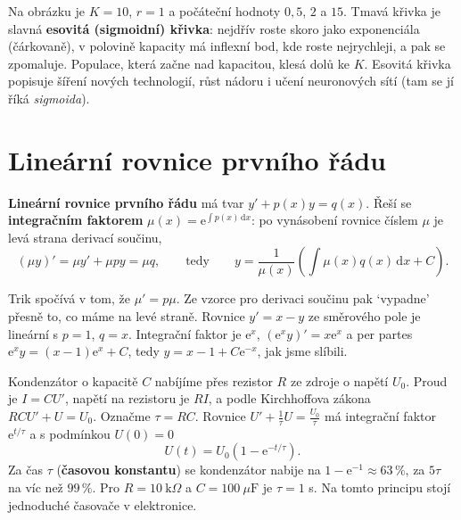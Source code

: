 Na obrázku je $K = 10$, $r = 1$ a počáteční hodnoty $0{,}5$, $2$ a $15$. Tmavá křivka je slavná \textbf{esovitá (sigmoidní) křivka}: nejdřív roste skoro jako exponenciála (čárkovaně), v polovině kapacity má inflexní bod, kde roste nejrychleji, a pak se zpomaluje. Populace, která začne nad kapacitou, klesá dolů ke $K$. Esovitá křivka popisuje šíření nových technologií, růst nádoru i učení neuronových sítí (tam se jí říká \textit{sigmoida}).

\section{Lineární rovnice prvního řádu}

\begin{definitionbox}
  \textbf{Lineární rovnice prvního řádu} má tvar $y' + p(x)y = q(x)$. Řeší se \textbf{integračním faktorem} $\mu(x) = \mathrm{e}^{\int p(x)\,\mathrm{d}x}$: po vynásobení rovnice číslem $\mu$ je levá strana derivací součinu,
  \begin{equation*}
    (\mu y)' = \mu y' + \mu p y = \mu q,\qquad\text{tedy}\qquad y = \frac{1}{\mu(x)}\left(\int\mu(x)q(x)\,\mathrm{d}x + C\right).
  \end{equation*}
\end{definitionbox}

Trik spočívá v tom, že $\mu' = p\mu$. Ze vzorce pro derivaci součinu pak `vypadne' přesně to, co máme na levé straně. Rovnice $y' = x - y$ ze směrového pole je lineární s $p = 1$, $q = x$. Integrační faktor je $\mathrm{e}^x$, $(\mathrm{e}^xy)' = x\mathrm{e}^x$ a per partes $\mathrm{e}^xy = (x - 1)\mathrm{e}^x + C$, tedy $y = x - 1 + C\mathrm{e}^{-x}$, jak jsme slíbili.

\begin{example}
  Kondenzátor o kapacitě $C$ nabíjíme přes rezistor $R$ ze zdroje o napětí $U_0$. Proud je $I = CU'$, napětí na rezistoru je $RI$, a podle Kirchhoffova zákona $RCU' + U = U_0$. Označme $\tau = RC$. Rovnice $U' + \frac{1}{\tau}U = \frac{U_0}{\tau}$ má integrační faktor $\mathrm{e}^{t/\tau}$ a s podmínkou $U(0) = 0$
  \begin{equation*}
    U(t) = U_0\left(1 - \mathrm{e}^{-t/\tau}\right).
  \end{equation*}
  Za čas $\tau$ (\textbf{časovou konstantu}) se kondenzátor nabije na $1 - \mathrm{e}^{-1}\approx 63\,\%$, za $5\tau$ na víc než $99\,\%$. Pro $R = 10\ \mathrm{k}\Omega$ a $C = 100\ \mu\mathrm{F}$ je $\tau = 1$ s. Na tomto principu stojí jednoduché časovače v elektronice.
\end{example}

